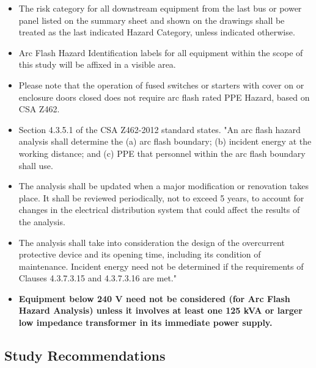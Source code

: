 \begin{itemize} 
\item The risk category for all downstream equipment from the last bus or power panel listed on the summary sheet and shown on the drawings shall be treated as the last indicated Hazard Category, unless indicated otherwise.

\item Arc Flash Hazard Identification labels for all equipment within the scope of this study will be affixed in a visible area.

\item Please note that the operation of fused switches or starters with cover on or enclosure doors closed does not require arc flash rated PPE Hazard, based on CSA Z462.

\item Section 4.3.5.1 of the CSA Z462-2012 standard states. "An arc flash hazard analysis shall determine the (a) arc flash boundary; (b) incident energy at the working distance; and (c) PPE that personnel within the arc flash boundary shall use.\cite{CSA}

\item The analysis shall be updated when a major modification or renovation takes place. It shall be reviewed periodically, not to exceed 5 years, to account for changes in the electrical distribution system that could affect the results of the analysis.\cite{CSA}


\item The analysis shall take into consideration the design of the overcurrent protective device and its opening time, including its condition of maintenance. Incident energy need not be determined if the requirements of Clauses 4.3.7.3.15 and 4.3.7.3.16 are met."\cite{CSA}
 
\item\textbf{Equipment below 240 V need not be considered (for Arc Flash Hazard Analysis) unless it involves at least one 125 kVA or larger low impedance transformer in its immediate power supply.}\cite{IEEE}	 
\end{itemize}
\pagebreak
\subsection{Study Recommendations}
\label{af:results:afsr}

